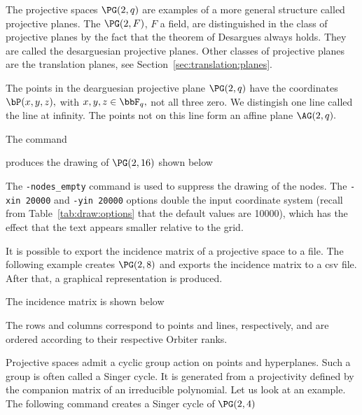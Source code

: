 The projective spaces $\PG(2,q)$ 
are examples of a more general structure called projective planes. 
The $\PG(2,F)$, $F$ a field, are distinguished 
in the class of projective planes 
by the fact that the theorem of Desargues 
always holds.
They are called the desarguesian projective planes.
Other classes of projective planes are the translation planes, 
see Section~\ref{sec:translation:planes}. 


\bigskip

The points in the dearguesian projective plane $\PG(2,q)$ 
have the coordinates $\bP(x,y,z),$ with $x,y,z\in \bbF_q,$ not all three zero. 
We distingish one line called the line at infinity. 
The points not on this line form an affine plane $\AG(2,q).$


\bigskip



The command 


produces the drawing of $\PG(2,16)$ shown below

The \verb'-nodes_empty' command is used to suppress the drawing of the nodes.
The \verb'-xin 20000' and \verb'-yin 20000' 
options double the input coordinate system 
(recall from Table~\ref{tab:draw:options} 
that the default values are 10000), 
which has the effect that the text appears smaller relative to the 
grid.


\bigskip


It is possible to export the incidence matrix of a projective space to a file.
The following example creates $\PG(2,8)$ and exports the incidence matrix to a csv file. 
After that, a graphical representation is produced.


The incidence matrix is shown below

The rows and columns correspond to points and lines, 
respectively, and are ordered according to their respective Orbiter ranks.



\bigskip




Projective spaces admit a cyclic group action on points and hyperplanes. 
Such a group is often called a Singer cycle. 
It is generated from a projectivity defined 
by the companion matrix of an irreducible polynomial. 
Let us look at an example. 
The following command creates a Singer cycle of $\PG(2,4)$

